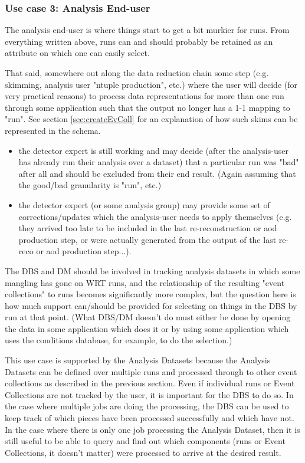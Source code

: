 \documentclass{cmspaper}
\begin{document}
\subsubsection{Use case 3: Analysis End-user}

  The analysis end-user is where things start to get a bit murkier for runs.
From everything written above, runs can and should probably be retained as 
an attribute on which one can easily select.

  That said, somewhere out along the data reduction chain some step (e.g. 
skimming, analysis user "ntuple production", etc.) where the user will
decide (for very practical reasons) to process data representations for more
than one run through some application such that the output no longer has
a 1-1 mapping to "run". See section \ref{sec:createEvColl} for an explanation of how such 
skims can be represented in the schema.


\begin{itemize}
\item the detector expert is still working and may decide (after the 
     analysis-user has already run their analysis over a dataset) that a
     particular run was "bad" after all and should be excluded from their
     end result. (Again assuming that the good/bad granularity is "run", etc.)
\item the detector expert (or some analysis group) may provide some set of
     corrections/updates which the analysis-user needs to apply themselves
     (e.g. they arrived too late to be included in the last re-reconstruction
     or aod production step, or were actually generated from the output of
     the last re-reco or aod production step...). 
\end{itemize}

The DBS and DM should be involved in tracking analysis datasets in which
some mangling has gone on WRT runs, and the relationship of the resulting 
"event collections" to runs becomes significantly more complex, but the 
question here is how much support can/should be provided for selecting on 
things in the DBS by run at that point. (What DBS/DM doesn't do must either 
be done by opening the data in some application which does it or by using 
some application which uses the conditions database, for example, to do the
selection.)

This use case is supported by the Analysis Datasets because the Analysis Datasets 
can be defined over multiple runs and processed through to other event collections
as described in the previous section.  Even if individual runs or Event Collections 
are not tracked by the user, it is important for the DBS to do so.  In the case 
where multiple jobs are doing the processing, the DBS can be used to keep track of
which pieces have been processed successfully and which have not.  In the case
where there is only one job processing the Analysis Dataset, then it is still 
useful to be able to query and find out which components 
(runs or Event Collections, it doesn't matter) were processed to 
arrive at the desired result.
\end{document}
